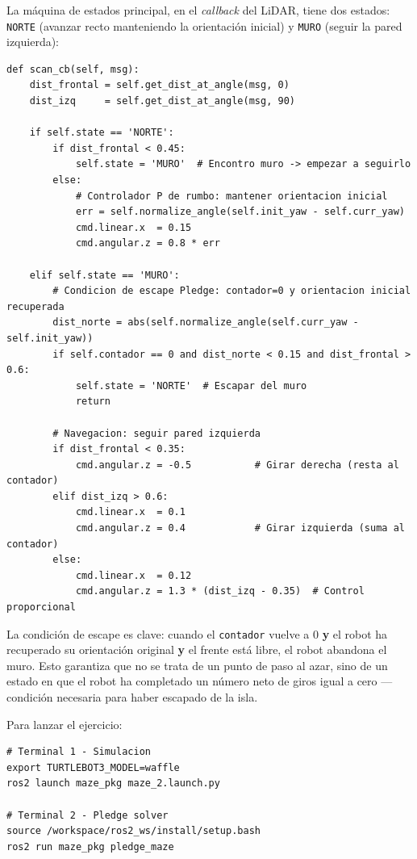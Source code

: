 La máquina de estados principal, en el \textit{callback} del LiDAR, tiene dos
estados: \texttt{NORTE} (avanzar recto manteniendo la orientación inicial) y
\texttt{MURO} (seguir la pared izquierda):

\begin{lstlisting}[style=python]
def scan_cb(self, msg):
    dist_frontal = self.get_dist_at_angle(msg, 0)
    dist_izq     = self.get_dist_at_angle(msg, 90)

    if self.state == 'NORTE':
        if dist_frontal < 0.45:
            self.state = 'MURO'  # Encontro muro -> empezar a seguirlo
        else:
            # Controlador P de rumbo: mantener orientacion inicial
            err = self.normalize_angle(self.init_yaw - self.curr_yaw)
            cmd.linear.x  = 0.15
            cmd.angular.z = 0.8 * err

    elif self.state == 'MURO':
        # Condicion de escape Pledge: contador=0 y orientacion inicial recuperada
        dist_norte = abs(self.normalize_angle(self.curr_yaw - self.init_yaw))
        if self.contador == 0 and dist_norte < 0.15 and dist_frontal > 0.6:
            self.state = 'NORTE'  # Escapar del muro
            return

        # Navegacion: seguir pared izquierda
        if dist_frontal < 0.35:
            cmd.angular.z = -0.5           # Girar derecha (resta al contador)
        elif dist_izq > 0.6:
            cmd.linear.x  = 0.1
            cmd.angular.z = 0.4            # Girar izquierda (suma al contador)
        else:
            cmd.linear.x  = 0.12
            cmd.angular.z = 1.3 * (dist_izq - 0.35)  # Control proporcional
\end{lstlisting}

La condición de escape es clave: cuando el \texttt{contador} vuelve a 0
\textbf{y} el robot ha recuperado su orientación original \textbf{y} el frente
está libre, el robot abandona el muro. Esto garantiza que no se trata de un
punto de paso al azar, sino de un estado en que el robot ha completado un
número neto de giros igual a cero --- condición necesaria para haber escapado
de la isla.

Para lanzar el ejercicio:

\begin{lstlisting}[style=bash]
# Terminal 1 - Simulacion
export TURTLEBOT3_MODEL=waffle
ros2 launch maze_pkg maze_2.launch.py

# Terminal 2 - Pledge solver
source /workspace/ros2_ws/install/setup.bash
ros2 run maze_pkg pledge_maze
\end{lstlisting}

